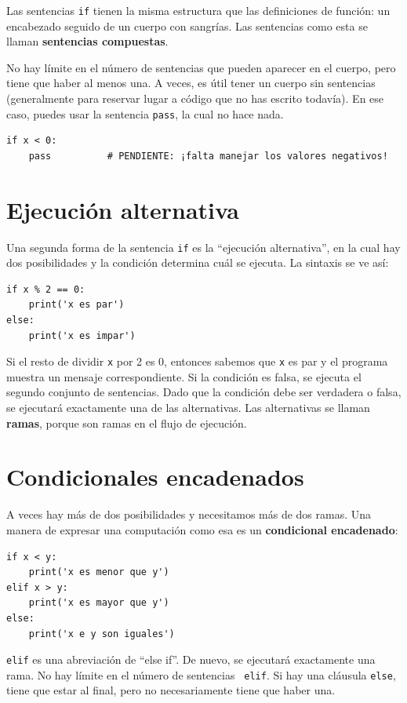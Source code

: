 \documentclass[10pt]{book}
\begin{document}
Las sentencias {\tt if} tienen la misma estructura que las definiciones de función:
un encabezado seguido de un cuerpo con sangrías.  Las sentencias como esta se
llaman {\bf sentencias compuestas}.

No hay límite en el número de sentencias que pueden aparecer en
el cuerpo, pero tiene que haber al menos una.
A veces, es útil tener un cuerpo sin sentencias (generalmente
para reservar lugar a código que no has escrito todavía).  En ese
caso, puedes usar la sentencia {\tt pass}, la cual no hace nada.

\begin{verbatim}
if x < 0:
    pass          # PENDIENTE: ¡falta manejar los valores negativos!
\end{verbatim}
%

\section{Ejecución alternativa}
\label{alternative.execution}

Una segunda forma de la sentencia {\tt if} es la ``ejecución alternativa'',
en la cual hay dos posibilidades y la condición determina
cuál se ejecuta.  La sintaxis se ve así:

\begin{verbatim}
if x % 2 == 0:
    print('x es par')
else:
    print('x es impar')
\end{verbatim}
%
Si el resto de dividir {\tt x} por 2 es 0, entonces sabemos que
{\tt x} es par y el programa muestra un mensaje correspondiente.  Si
la condición es falsa, se ejecuta el segundo conjunto de sentencias.
Dado que la condición debe ser verdadera o falsa, se ejecutará exactamente
una de las alternativas.  Las alternativas se llaman {\bf
  ramas}, porque son ramas en el flujo de ejecución.



\section{Condicionales encadenados}

A veces hay más de dos posibilidades y necesitamos más de
dos ramas.  Una manera de expresar una computación como esa es un {\bf
condicional encadenado}:

\begin{verbatim}
if x < y:
    print('x es menor que y')
elif x > y:
    print('x es mayor que y')
else:
    print('x e y son iguales')
\end{verbatim}
%
{\tt elif} es una abreviación de ``else if''.  De nuevo, se ejecutará exactamente
una rama.  No hay límite en el número de sentencias {\tt
elif}.  Si hay una cláusula {\tt else}, tiene que estar
al final, pero no necesariamente tiene que haber una.
\end{document}
